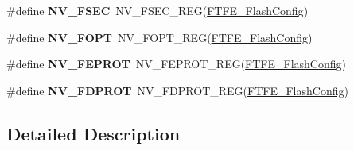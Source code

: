\begin{DoxyCompactItemize}
\item 
\#define {\bfseries N\+V\+\_\+\+F\+S\+EC}~N\+V\+\_\+\+F\+S\+E\+C\+\_\+\+R\+EG(\hyperlink{group__NV__Peripheral__Access__Layer_ga834657fb01c008d200d4e0aaa7857a2f}{F\+T\+F\+E\+\_\+\+Flash\+Config})\hypertarget{group__NV__Register__Accessor__Macros_ga6bdca22aa1e76ebd389ecf4a5d70b93c}{}\label{group__NV__Register__Accessor__Macros_ga6bdca22aa1e76ebd389ecf4a5d70b93c}

\item 
\#define {\bfseries N\+V\+\_\+\+F\+O\+PT}~N\+V\+\_\+\+F\+O\+P\+T\+\_\+\+R\+EG(\hyperlink{group__NV__Peripheral__Access__Layer_ga834657fb01c008d200d4e0aaa7857a2f}{F\+T\+F\+E\+\_\+\+Flash\+Config})\hypertarget{group__NV__Register__Accessor__Macros_gad508c386413905d31c12a2319fa355e3}{}\label{group__NV__Register__Accessor__Macros_gad508c386413905d31c12a2319fa355e3}

\item 
\#define {\bfseries N\+V\+\_\+\+F\+E\+P\+R\+OT}~N\+V\+\_\+\+F\+E\+P\+R\+O\+T\+\_\+\+R\+EG(\hyperlink{group__NV__Peripheral__Access__Layer_ga834657fb01c008d200d4e0aaa7857a2f}{F\+T\+F\+E\+\_\+\+Flash\+Config})\hypertarget{group__NV__Register__Accessor__Macros_ga042021b7c9ba543352055825ab37f11b}{}\label{group__NV__Register__Accessor__Macros_ga042021b7c9ba543352055825ab37f11b}

\item 
\#define {\bfseries N\+V\+\_\+\+F\+D\+P\+R\+OT}~N\+V\+\_\+\+F\+D\+P\+R\+O\+T\+\_\+\+R\+EG(\hyperlink{group__NV__Peripheral__Access__Layer_ga834657fb01c008d200d4e0aaa7857a2f}{F\+T\+F\+E\+\_\+\+Flash\+Config})\hypertarget{group__NV__Register__Accessor__Macros_gaa36202cc8cc9caa02eee166ffce5efc6}{}\label{group__NV__Register__Accessor__Macros_gaa36202cc8cc9caa02eee166ffce5efc6}

\end{DoxyCompactItemize}


\subsection{Detailed Description}
